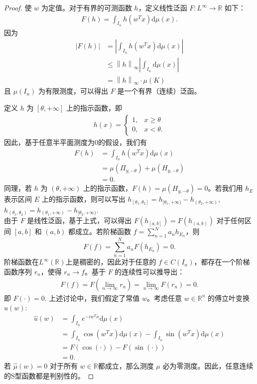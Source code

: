 \documentclass[12pt]{article}
\begin{document}
\begin{proof}
使 $w$ 为定值。对于有界的可测函数 $h$，定义线性泛函 $F: L^{\infty}\to\mathbb{R}$ 如下：
\begin{align*}
    F(h)=\int_{I_n} h(w^Tx)\mathrm{d}\mu(x).
\end{align*}
因为
\begin{align*}
\left|F(h)\right|&=\left|\int_{I_n}h(w^Tx)\mathrm{d}\mu(x)\right|\\
&\leq {\left\lVert h\right\rVert}_{\infty}\left|\int_{I_n}\mathrm{d}\mu(x)\right|\\
&={\left\lVert h\right\rVert}_{\infty}\cdot \mu(K)
\end{align*}
且 $\mu(I_n)$ 为有限测度，可以得出 $F$ 是一个有界（连续）泛函。

定义 $h$ 为 $[\theta,+\infty]$ 上的指示函数，即
\begin{align*}
    h(x)=\begin{cases}
        1, & x\geq \theta\\
        0, & x<\theta.
    \end{cases}
\end{align*}
因此，基于任意半平面测度为0的假设，我们有
\begin{align*}
    F(h)&=\int_{I_n} h(w^Tx)\mathrm{d}\mu(x)\\
    &=\mu(\Pi_{y,-\theta})+\mu(H_{y,-\theta})\\
    &=0.
\end{align*}
同理，若 $h$ 为 $(\theta,+\infty)$ 上的指示函数，$F(h)=\mu(H_{y,-\theta})=0$。若我们用 $h_E$ 表示区间 $E$ 上的指示函数，则可以写出
$
    h_{[\theta_1,\theta_2]}=h_{[\theta_1,+\infty)}-h_{(\theta_2,+\infty)}$,
    $h_{(\theta_1,\theta_2)}=h_{(\theta_1,+\infty)}-h_{[\theta_2,+\infty)}
$.
\\

由于 $F$ 是线性泛函，基于上式，可以得出 $F(h_{[a,b]})=F(h_{(a,b)})$ 对于任何区间 $[a,b]$ 和 $(a,b)$ 都成立。若阶梯函数 $f=\sum_{n=1}^N a_n h_{E_n}$，则 $$F(f)=\sum_{n=1}^N a_nF(h_{E_n})=0.$$
阶梯函数在$L^{\infty}(\mathbb{R})$上是稠密的，因此对于任意的 $f\in C(I_n)$，都存在一个阶梯函数序列 $r_n$，使得 $r_n\to f$。基于 $F$ 的连续性可以推导出：
\begin{align*}
    F(f)=F(\lim_{n\to\infty}r_n)=\lim_{n\to\infty} F(r_n)=0.
\end{align*}
即 $F(\cdot)=0$. 上述讨论中，我们假定了常值 $w$。考虑任意 $w\in \mathbb{R}^n$ 的傅立叶变换 $\hat{u}(w)$:
\begin{align*}
    \hat{u}(w)&=\int_{I_n} e^{-iw^Tx}\mathrm{d}\mu(x)\\
    &=\int_{I_n} \cos(w^Tx)\mathrm{d}\mu(x)-\int_{I_n} \sin(w^Tx)\mathrm{d}\mu(x)\\
    &=F(\cos(\cdot))-F(\sin(\cdot))\\
    &=0.
\end{align*}
若 $\hat{\mu}(w)=0$ 对于所有 $w\in \mathbb{R}$都成立，那么测度 $\mu$ 必为零测度。因此，任意连续的S型函数都是判别性的。
\end{proof}
\end{document}
